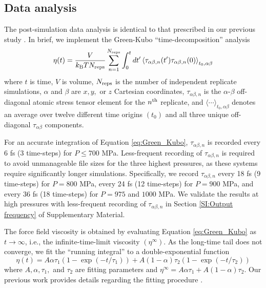 \documentclass[preprint,review,12pt]{elsarticle}
\begin{document}
	\subsection{Data analysis}
	
	The post-simulation data analysis is identical to that prescribed in our previous study \cite{Postdoc_3}. In brief, we implement the Green-Kubo ``time-decomposition'' analysis \cite{Maginn2018,Zhang2015}
	\begin{equation} \label{eq:Green_Kubo}
	\eta(t) = \frac{V}{k_{\rm B} T N_{\rm reps}} \sum_{n=1}^{N_{\rm reps}} \int_{0}^{t}dt'\left\langle \tau_{\alpha\beta,n}(t') \tau_{\alpha\beta,n}(0)\right\rangle_{t_0,\alpha\beta}
	\end{equation} 
	where $t$ is time, $V$ is volume, $N_{\rm reps}$ is the number of independent replicate simulations, $\alpha$ and $\beta$ are $x, y, $ or $z$ Cartesian coordinates, $\tau_{\alpha\beta,n}$ is the $\alpha$-$\beta$ off-diagonal atomic stress tensor element for the $n^{\rm th}$ replicate, and $\langle \cdots \rangle_{t_0,\alpha\beta}$ denotes an average over twelve different time origins $(t_0)$ and all three unique off-diagonal $\tau_{\alpha\beta}$ components. 
	
	For an accurate integration of Equation \ref{eq:Green_Kubo}, $\tau_{\alpha\beta,n}$ is recorded every 6 fs (3 time-steps) for $P \le 700$ MPa. Less-frequent recording of $\tau_{\alpha\beta,n}$ is required to avoid unmanageable file sizes for the three highest pressures, as these systems require significantly longer simulations. Specifically, we record $\tau_{\alpha\beta,n}$ every 18 fs (9 time-steps) for $P = 800$ MPa, every 24 fs (12 time-steps) for $P = 900$ MPa, and every 36 fs (18 time-steps) for $P = 975$ and $1000$ MPa. We validate the results at high pressures with less-frequent recording of $\tau_{\alpha\beta,n}$ in Section \ref{SI:Output frequency} of Supplementary Material.  
	
	
	
	The force field viscosity is obtained by evaluating Equation \ref{eq:Green_Kubo} as $t \rightarrow \infty$, i.e., the infinite-time-limit viscosity $(\eta^\infty)$. As the long-time tail does not converge, we fit the ``running integral'' to a double-exponential function
	\begin{equation} \label{eq: Double exponential}
	\eta(t) = A \alpha \tau_1 \left(1-\exp{(-t/\tau_1)}\right) + A (1-\alpha) \tau_2 \left(1-\exp{(-t/\tau_2)}\right)
	\end{equation}
	where $A, \alpha, \tau_1, $ and $\tau_2$ are fitting parameters and $\eta^\infty = A \alpha \tau_1 + A (1-\alpha) \tau_2$. Our previous work provides details regarding the fitting procedure \cite{Postdoc_3}. 
	
\end{document}
